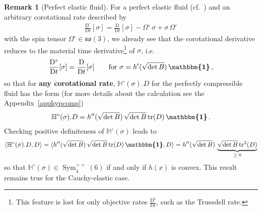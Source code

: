 \documentclass[10pt]{article}
\newcounter{theoremCounter}
\numberwithin{theoremCounter}{section}
\theoremstyle{plain}
\theoremstyle{definition}
\newtheorem{rem}[theoremCounter]{Remark}
\newcommand{\id}{{\boldsymbol{\mathbbm{1}}}}
\newcommand{\DD}{\mathrm{D}}
\DeclareMathOperator{\Sym}{Sym}
\DeclareMathOperator{\tr}{tr}
\def\tr{\textnormal{tr}}
\def\H{\mathbb{H}}
\numberwithin{equation}{section}
\begin{document}
%
\begin{rem}[Perfect elastic fluid]
For a perfect elastic fluid (cf.~\cite[p.~10]{Marsden83}) and an arbitrary corotational rate described by
	\begin{align}
	\frac{\DD^{\circ}}{\DD t}[\sigma] = \frac{\DD}{\DD t}[\sigma] - \Omega^{\circ} \, \sigma + \sigma \, \Omega^{\circ}
	\end{align}
with the spin tensor $\Omega^{\circ} \in \mathfrak{so}(3)$, we already see that the corotational derivative reduces to the material time derivative\footnote
{
This feature is lost for only objective rates $\frac{\DD^{\sharp}}{\DD t}$, such as the Truesdell rate.
}
of $\sigma$, i.e.
	\begin{align}
	\frac{\DD^{\circ}}{\DD t}[\sigma] = \frac{\DD}{\DD t}[\sigma] \qquad \textnormal{for $\sigma = h'(\sqrt{\det B}) \, \id$} \, ,
	\end{align}
so that for \textbf{any corotational rate}, $\H^{\circ}(\sigma).D$ for the perfectly compressible fluid has the form (for more details about the calculation see the Appendix~\ref{apphypcomp})
	\begin{align}
	\H^{\circ}(\sigma).D = h''(\sqrt{\det B}) \, \sqrt{\det B} \, \tr(D) \, \id \, .
	\end{align}
Checking positive definiteness of $\H^{\circ}(\sigma)$ leads to
	\begin{align}
	\langle \H^{\circ}(\sigma).D , D \rangle = \langle h''(\sqrt{\det B}) \, \sqrt{\det B} \, \tr(D) \, \id, D \rangle = h''(\sqrt{\det B}) \, \underbrace{\sqrt{\det B} \, \tr^2(D)}_{\ge \; 0}
	\end{align}
so that $\H^{\circ}(\sigma) \in \Sym^{++}_4(6)$ if and only if $h(x)$ is convex. This result remains true for the Cauchy-elastic case.
\end{rem}



%
\end{document}
